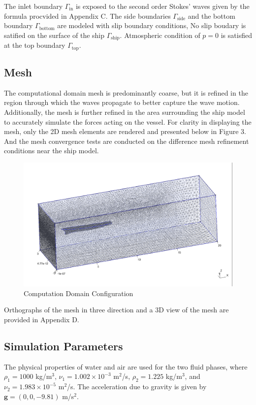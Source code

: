 \documentclass[12pt]{article} %
\begin{document}
The inlet boundary \(\Gamma_{\text{in}}\) is exposed to the second order Stokes' waves given by the formula 
procvided in Appendix C. The side boundaries \(\Gamma_{\text{side}}\) and the bottom boundary 
\(\Gamma_{\text{bottom}}\) are modeled with slip boundary conditions, 
No slip boudary is satified on the surface of the ship \(\Gamma_{\text{ship}}\). 
Atmospheric condition of \(p = 0\) is satisfied at the top boundary \(\Gamma_{\text{top}}\).

\subsection{Mesh}
The computational domain mesh is predominantly coarse, but it is refined in the region through which the waves 
propagate to better capture the wave motion. Additionally, the mesh is further refined in the area surrounding 
the ship model to accurately simulate the forces acting on the vessel. For clarity in displaying the mesh, 
only the 2D mesh elements are rendered and presented below in Figure 3. And the mesh convergence tests are
conducted on the difference mesh refinement conditions near the ship model.

\begin{figure}[ht]
    \centering
    \includegraphics[width=1\textwidth]{Mesh_1.png}
    \caption{Computation Domain Configuration}
\end{figure}
Orthographs of the mesh in three direction and a 3D view of the mesh are provided in Appendix D.
\subsection{Simulation Parameters}
The physical properties of water and air are used for the two fluid phases, where \(\rho_1 = 1000\) kg/m\(^3\), \(\nu_1 = 1.002 \times 10^{-3}\) m\(^2\)/s, \(\rho_2 = 1.225\) kg/m\(^3\), and \(\nu_2 = 1.983 \times 10^{-5}\) m\(^2\)/s. The acceleration due to gravity is given by \(\mathbf{g} = (0, 0, -9.81)\) m/s\(^2\).
\end{document}
